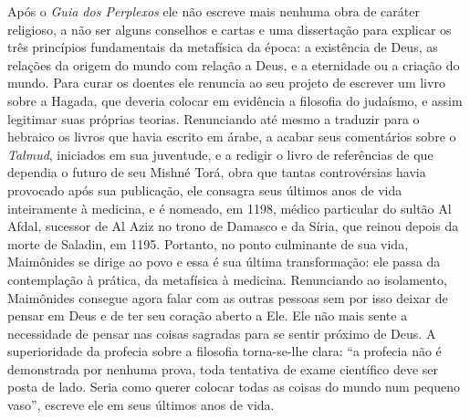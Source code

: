Após o \emph{Guia dos Perplexos} ele não escreve mais nenhuma obra de
caráter religioso, a não ser alguns conselhos e cartas e uma dissertação
para explicar os três princípios fundamentais da metafísica da época: a
existência de Deus, as relações da origem do mundo com relação a Deus, e
a eternidade ou a criação do mundo. Para curar os doentes ele renuncia
ao seu projeto de escrever um livro sobre a Hagada, que deveria colocar
em evidência a filosofia do judaísmo, e assim legitimar suas próprias
teorias. Renunciando até mesmo a traduzir para o hebraico os livros que
havia escrito em árabe, a acabar seus comentários sobre o \emph{Talmud},
iniciados em sua juventude, e a redigir o livro de referências de que
dependia o futuro de seu Mishné Torá, obra que tantas
controvérsias havia provocado após sua publicação, ele consagra seus
últimos anos de vida inteiramente à medicina, e é nomeado, em 1198,
médico particular do sultão Al Afdal, sucessor de Al Aziz no trono de
Damasco e da Síria, que reinou depois da morte de Saladin, em 1195.
Portanto, no ponto culminante de sua vida, Maimônides se dirige ao povo
e essa é sua última transformação: ele passa da contemplação à prática,
da metafísica à medicina. Renunciando ao isolamento, Maimônides
consegue agora falar com as outras pessoas sem por isso deixar de pensar
em Deus e de ter seu coração aberto a Ele. Ele não mais sente a
necessidade de pensar nas coisas sagradas para se sentir próximo de
Deus. A superioridade da profecia sobre a filosofia torna-se-lhe clara:
``a profecia não é demonstrada por nenhuma prova, toda tentativa de
exame científico deve ser posta de lado. Seria como querer colocar
todas as coisas do mundo num pequeno vaso'', escreve ele em seus últimos
anos de vida.

